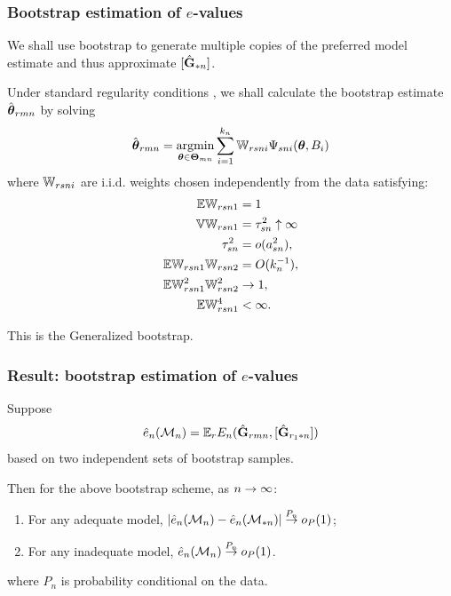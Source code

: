 \documentclass[handout,10pt]{beamer}
\DeclareMathOperator*{\argmin}{argmin}
\begin{document}
\begin{frame}
\frametitle{Bootstrap estimation of $e$-values}
We shall use bootstrap to generate multiple copies of the preferred model estimate and thus approximate $[ \hat {{\mathbf{G}}}_{* n}]$.

Under standard regularity conditions \citep{ChatterjeeBose05}, we shall calculate the bootstrap estimate $\hat {{\boldsymbol{\theta}}}_{r m n}$ by solving
%
$$
\hat \bftheta_{r m n} = \argmin_{ \bftheta \in \bfTheta_{m n}} \sum_{i=1}^{k_n} \BW_{r s n i} \Psi_{s n i} (\bftheta, B_i) 
$$
%
where ${\mathbb{W}}_{r s n i}$ are i.i.d. weights chosen independently from the data satisfying:
\begin{eqnarray*}
{\mathbb{E}} {\mathbb{W}}_{r s n 1}  & = 1\\
{\mathbb{V}} {\mathbb{W}}_{r s n 1}  & = \tau_{s n}^{2} \uparrow \infty\\
\tau_{s n}^{2} 
& = o ( a_{s n}^{2}), 
\label{eq:TauSqCondition}\\
{\mathbb{E}} {\mathbb{W}}_{r s n 1} {\mathbb{W}}_{r s n 2} & = O (k_{n}^{-1}), 
\label{eq:c11} \\
{\mathbb{E}} {\mathbb{W}}_{r s n 1}^{2} {\mathbb{W}}_{r s n 2}^{2} & \rightarrow 1, 
\label{eq:c22} \\
{\mathbb{E}} {\mathbb{W}}_{r s n 1}^{4} & < \infty. 
\label{eq:c22}
\end{eqnarray*}

This is the {\colbit Generalized bootstrap}.
\end{frame}


\begin{frame}
\frametitle{Result: bootstrap estimation of $e$-values}

\begin{theorem}
Suppose
%
$$
\hat e_n ({\cal{M}}_n) =  {\mathbb{E}}_r E_n (\hat {{\mathbf{G}}}_{r m n}, [\hat {{\mathbf{G}}}_{r_1 * n}])
$$
%
based on two independent sets of bootstrap samples.

Then for the above bootstrap scheme, as $n \rightarrow \infty$:
%
\begin{enumerate}
\item For any adequate model, $| \hat e_n ({\cal{M}}_n ) - \hat e_n ({\cal{M}}_{* n} ) | \stackrel{P_n}{\rightarrow} o_P (1)$;
\item For any inadequate model, $ \hat e_n ({\cal{M}}_n ) \stackrel{P_n}{\rightarrow} o_P (1)$.
\end{enumerate}
%
where $P_n$ is probability conditional on the data.
\end{theorem}

\end{frame}
\end{document}
